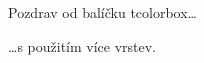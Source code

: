 \documentclass{standalone}
\begin{document}
\begin{tcolorbox}[frogbox, ribbon, title=Experiment]
Pozdrav od balíčku \textsf{tcolorbox}\ldots\par\ldots s použitím více vrstev.
\end{tcolorbox}
\end{document}
